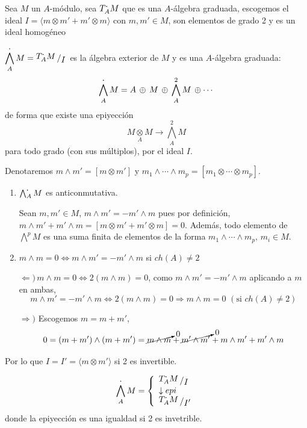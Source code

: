 Sea $M$ un $A$-m\'odulo, sea $T^{\boldsymbol{\cdot}}_A M$ que es una $A$-\'algebra graduada, escogemos el ideal $I = \langle m \otimes m' + m' \otimes m \rangle$ con $m,m'\in M$, son elementos de grado 2 y es un ideal homog\'eneo
\begin{defi}
    $\displaystyle \bigwedge^{\bdot}_A M = \modulo{T^{\bdot}_A M }{I}$ es la \'algebra exterior de $M$ y es una $A$-\'algebra graduada:
    $$ \bigwedge^{\boldsymbol{\cdot}}_A M = A \, \oplus \, M \, \oplus \,  \bigwedge^{2}_A M  \, \oplus \cdots $$
    de forma que existe una epiyecci\'on
    $$M \underset{A}{\otimes}M \longrightarrow  \bigwedge^{2}_A M $$
    para todo grado (con sus m\'ultiplos), por el ideal $I$.

    Denotaremos $m \wedge m' = [m \otimes m']$ y $m_1 \wedge \cdots \wedge m_p = [m_1 \otimes \cdots \otimes m_p]$.
\end{defi}
\begin{prop}
\begin{enumerate}
    \item $ \bigwedge^{\boldsymbol{\cdot}}_A M $ es anticonmutativa.
\begin{dem}
    Sean $m,m' \in M$, $m \wedge m' = -m'\wedge m$ pues por definici\'on, $m \wedge m' +m'\wedge m  = [ m\otimes m' + m' \otimes m]= 0$. Adem\'as, todo elemento de $ \bigwedge^{p} M $ es una suma finita de elementos de la forma $m_1\wedge \cdots \wedge m_p, \, m_i \in M$.
\end{dem}
\item $m \wedge m =0  \iff m \wedge m' = - m' \wedge m$ si $ch(A)\neq 2$
\begin{dem} $\Leftarrow) \, m \wedge m =0 \iff 2 (m \wedge m)=0$, como $m\wedge m' = -m'\wedge m$ aplicando a $m$ en ambas, $$m\wedge m' = -m'\wedge m \iff 2(m \wedge m)=0 \Rightarrow m \wedge m = 0 \, \, (\text{si } ch(A) \neq 2)$$

$\Rightarrow)$ Escogemos $m = m + m'$,
$$0 = (m+m') \wedge (m+m') = \cancelto{0}{m \wedge m} + \cancelto{0}{m' \wedge m'} + m \wedge m' + m' \wedge m $$
\end{dem}
\end{enumerate}
\end{prop}
\begin{cor}
    Por lo que $I = I' = \langle m \otimes m' \rangle$ si 2 es invertible.
\end{cor}
\begin{prop}
    $$ \bigwedge^{\bdot}_A M = \left\{ \begin{array}{l}
         \modulo{T^{\bdot}_A M}{I}  \\
         \downarrow epi \\
          \modulo{T^{\bdot}_A M}{I'}
    \end{array} \right.$$
    donde la epiyecci\'on es una igualdad si 2 es invetrible.
\end{prop}
